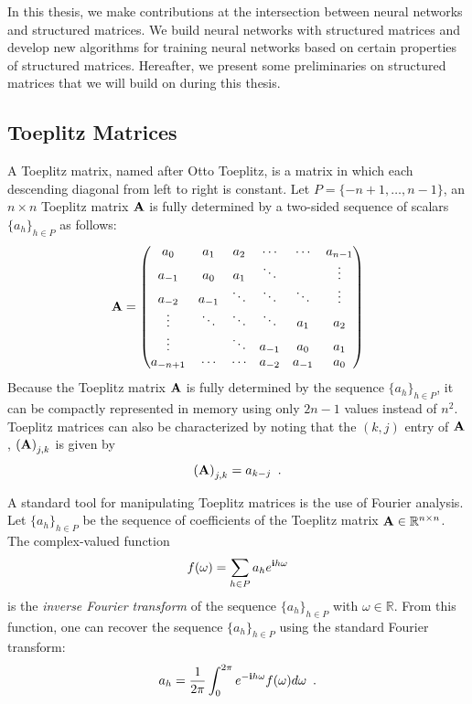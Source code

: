 

In this thesis, we make contributions at the intersection between neural networks and structured matrices.
We build neural networks with structured matrices and develop new algorithms for training neural networks based on certain properties of structured matrices. 
Hereafter, we present some preliminaries on structured matrices that we will build on during this thesis.

\subsection{Toeplitz Matrices}
\label{subsection:ch2-toeplitz_matrices}

A Toeplitz matrix, named after Otto Toeplitz, is a matrix in which each descending diagonal from left to right is constant.
Let $P = \{-n+1, \dots, n-1\}$, an $n\times n$ Toeplitz matrix $\mathbf{A}$ is fully determined by a two-sided sequence of scalars $\{a_h\}_{h \in P}$ as follows:
\begin{equation}
  \mathbf{A} =
  \begin{pmatrix}
    a_0 & a_{1} & a_{2} & \cdots & \cdots & a_{n-1} \\
    a_{-1} & a_0 & a_{1} & \ddots & & \vdots \\
    a_{-2} & a_{-1} & \ddots & \ddots & \ddots & \vdots \\
    \vdots & \ddots & \ddots & \ddots & a_{1} & a_{2} \\
    \vdots & & \ddots & a_{-1} & a_{0} & a_{1} \\
    a_{-n+1} & \cdots & \cdots & a_{-2} & a_{-1} & a_0
  \end{pmatrix}
\end{equation}
\noindent
Because the Toeplitz matrix $\mathbf{A}$ is fully determined by the sequence $\{a_h\}_{h \in P}$, it can be compactly represented in memory using only $2n-1$ values instead of $n^2$.
Toeplitz matrices can also be characterized by noting that the $(k,j)$ entry of $\mathbf{A}$, $\leftmat \Amat \rightmat_{j,k}$ is given by
\begin{equation}
  \leftmat \Amat \rightmat_{j,k} = a_{k-j} \enspace.
\end{equation}

A standard tool for manipulating Toeplitz matrices is the use of Fourier analysis.
Let $\{a_h\}_{h \in P}$ be the sequence of coefficients of the Toeplitz matrix $\mathbf{A} \in \mathbb{R}^{n\times n}$.
The complex-valued function 
\begin{equation}
  f(\omega) = \sum_{h \in P} a_h e^{\mathbf{i} h \omega}
\end{equation}
is the \emph{inverse Fourier transform} of the sequence $\{a_h\}_{h \in P}$ with $\omega \in \mathbb{R}$.
From this function, one can recover the sequence $\{a_h\}_{h \in P}$ using the standard Fourier transform:
\begin{equation}
  a_h = \frac{1}{2\pi} \int_0^{2\pi} e^{-\mathbf{i} h \omega} f(\omega) d\omega \enspace. 
\end{equation}

